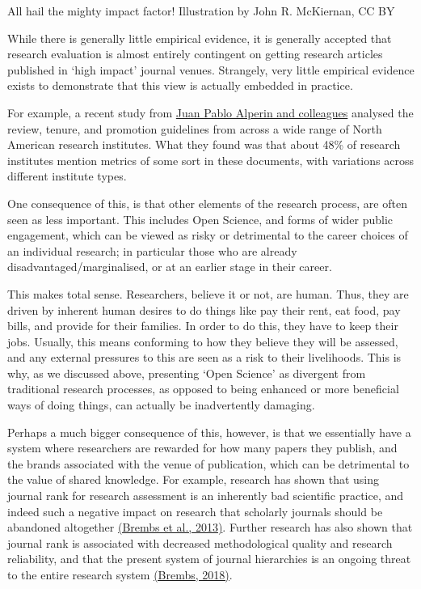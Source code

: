 \documentclass[]{book}
\begin{document}
All hail the mighty impact factor! Illustration by John R. McKiernan, CC BY

While there is generally little empirical evidence, it is generally accepted that research evaluation is almost entirely contingent on getting research articles published in `high impact' journal venues. Strangely, very little empirical evidence exists to demonstrate that this view is actually embedded in practice.

For example, a recent study from \href{https://hcommons.org/deposits/item/hc:21015/}{Juan Pablo Alperin and colleagues} analysed the review, tenure, and promotion guidelines from across a wide range of North American research institutes. What they found was that about 48\% of research institutes mention metrics of some sort in these documents, with variations across different institute types.

One consequence of this, is that other elements of the research process, are often seen as less important. This includes Open Science, and forms of wider public engagement, which can be viewed as risky or detrimental to the career choices of an individual research; in particular those who are already disadvantaged/marginalised, or at an earlier stage in their career.

This makes total sense. Researchers, believe it or not, are human. Thus, they are driven by inherent human desires to do things like pay their rent, eat food, pay bills, and provide for their families. In order to do this, they have to keep their jobs. Usually, this means conforming to how they believe they will be assessed, and any external pressures to this are seen as a risk to their livelihoods. This is why, as we discussed above, presenting `Open Science' as divergent from traditional research processes, as opposed to being enhanced or more beneficial ways of doing things, can actually be inadvertently damaging.

Perhaps a much bigger consequence of this, however, is that we essentially have a system where researchers are rewarded for how many papers they publish, and the brands associated with the venue of publication, which can be detrimental to the value of shared knowledge. For example, research has shown that using journal rank for research assessment is an inherently bad scientific practice, and indeed such a negative impact on research that scholarly journals should be abandoned altogether \href{https://www.frontiersin.org/articles/10.3389/fnhum.2013.00291/full}{(Brembs et al., 2013)}. Further research has also shown that journal rank is associated with decreased methodological quality and research reliability, and that the present system of journal hierarchies is an ongoing threat to the entire research system \href{https://www.frontiersin.org/articles/10.3389/fnhum.2018.00037/full}{(Brembs, 2018)}.
\end{document}

